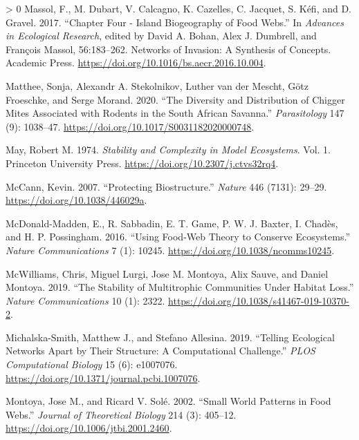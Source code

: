 \documentclass[10pt,oneside]{article}
\newlength{\cslhangindent}
\newenvironment{CSLReferences}[3] %
 {%
  \setlength{\parindent}{0pt}
  \ifodd #1 \everypar{\setlength{\hangindent}{\cslhangindent}}\ignorespaces\fi
  \ifnum #2 > 0
  \setlength{\parskip}{#2\baselineskip}
  \fi
 }%
 {}
\begin{document}
\begin{CSLReferences}{1}{0}
\leavevmode\hypertarget{ref-Massol2017ChaFou}{}%
Massol, F., M. Dubart, V. Calcagno, K. Cazelles, C. Jacquet, S. Kéfi,
and D. Gravel. 2017. {``Chapter Four - Island Biogeography of Food
Webs.''} In \emph{Advances in Ecological Research}, edited by David A.
Bohan, Alex J. Dumbrell, and François Massol, 56:183--262. Networks of
Invasion: A Synthesis of Concepts. Academic Press.
\url{https://doi.org/10.1016/bs.aecr.2016.10.004}.

\leavevmode\hypertarget{ref-Matthee2020DivDis}{}%
Matthee, Sonja, Alexandr A. Stekolnikov, Luther van der Mescht, Götz
Froeschke, and Serge Morand. 2020. {``The Diversity and Distribution of
Chigger Mites Associated with Rodents in the South African Savanna.''}
\emph{Parasitology} 147 (9): 1038--47.
\url{https://doi.org/10.1017/S0031182020000748}.

\leavevmode\hypertarget{ref-May1974StaCom}{}%
May, Robert M. 1974. \emph{Stability and Complexity in Model
Ecosystems}. Vol. 1. Princeton University Press.
\url{https://doi.org/10.2307/j.ctvs32rq4}.

\leavevmode\hypertarget{ref-McCann2007ProBio}{}%
McCann, Kevin. 2007. {``Protecting Biostructure.''} \emph{Nature} 446
(7131): 29--29. \url{https://doi.org/10.1038/446029a}.

\leavevmode\hypertarget{ref-McDonald-Madden2016UsiFoo}{}%
McDonald-Madden, E., R. Sabbadin, E. T. Game, P. W. J. Baxter, I.
Chadès, and H. P. Possingham. 2016. {``Using Food-Web Theory to Conserve
Ecosystems.''} \emph{Nature Communications} 7 (1): 10245.
\url{https://doi.org/10.1038/ncomms10245}.

\leavevmode\hypertarget{ref-McWilliams2019StaMul}{}%
McWilliams, Chris, Miguel Lurgi, Jose M. Montoya, Alix Sauve, and Daniel
Montoya. 2019. {``The Stability of Multitrophic Communities Under
Habitat Loss.''} \emph{Nature Communications} 10 (1): 2322.
\url{https://doi.org/10.1038/s41467-019-10370-2}.

\leavevmode\hypertarget{ref-Michalska-Smith2019TelEco}{}%
Michalska-Smith, Matthew J., and Stefano Allesina. 2019. {``Telling
Ecological Networks Apart by Their Structure: A Computational
Challenge.''} \emph{PLOS Computational Biology} 15 (6): e1007076.
\url{https://doi.org/10.1371/journal.pcbi.1007076}.

\leavevmode\hypertarget{ref-Montoya2002SmaWor}{}%
Montoya, Jose M., and Ricard V. Solé. 2002. {``Small World Patterns in
Food Webs.''} \emph{Journal of Theoretical Biology} 214 (3): 405--12.
\url{https://doi.org/10.1006/jtbi.2001.2460}.


\end{CSLReferences}
\end{document}
